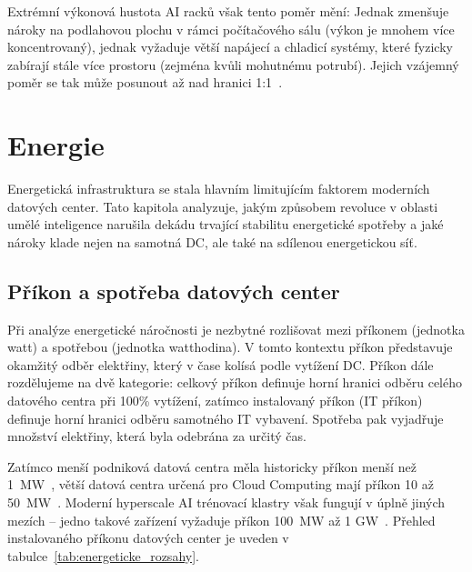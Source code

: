 Extrémní výkonová hustota AI racků však tento poměr mění: Jednak zmenšuje nároky na podlahovou plochu v rámci počítačového sálu (výkon je mnohem více koncentrovaný), jednak vyžaduje větší napájecí a chladicí systémy, které fyzicky zabírají stále více prostoru (zejména kvůli mohutnému potrubí). Jejich vzájemný poměr se tak může posunout až nad hranici 1:1~\cite{butler_unlocking_2025}.

\section{Energie}
\label{sec:energie}


Energetická infrastruktura se stala hlavním limitujícím faktorem moderních datových center. Tato kapitola analyzuje, jakým způsobem revoluce v oblasti umělé inteligence narušila dekádu trvající stabilitu energetické spotřeby a jaké nároky klade nejen na samotná DC, ale také na sdílenou energetickou síť.

\subsection{Příkon a spotřeba datových center}
\label{subsec:prikon}

Při analýze energetické náročnosti je nezbytné rozlišovat mezi příkonem (jednotka watt) a spotřebou (jednotka watthodina). V tomto kontextu příkon představuje okamžitý odběr elektřiny, který v čase kolísá podle vytížení DC. Příkon dále rozdělujeme na dvě kategorie: celkový příkon definuje horní hranici odběru celého datového centra při 100\% vytížení, zatímco instalovaný příkon (IT příkon) definuje horní hranici odběru samotného IT vybavení. Spotřeba pak vyjadřuje množství elektřiny, která byla odebrána za určitý čas.

Zatímco menší podniková datová centra měla historicky příkon menší než 1~MW~\cite{barroso_data_2026, sheng_power_2026}, větší datová centra určená pro Cloud Computing mají příkon 10 až 50~MW~\cite[s.~38]{international_energy_agency_iea_energy_2025}. Moderní hyperscale AI trénovací klastry však fungují v úplně jiných mezích -- jedno takové zařízení vyžaduje příkon 100~MW až 1 GW~\cite{sheng_power_2026, chen_electricity_2025}. Přehled instalovaného příkonu datových center je uveden v tabulce~\ref{tab:energeticke_rozsahy}.

